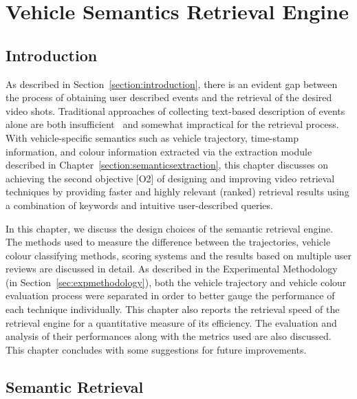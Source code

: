 
\chapter{Vehicle Semantics Retrieval Engine}

\label{section:retrievalengine}
\section{Introduction}

As described in Section~\ref{section:introduction}, there is an evident gap between the process of obtaining user described events and the retrieval of the desired video shots. Traditional approaches of collecting text-based description of events alone are both insufficient~\cite{bhaumik2016hybrid} and somewhat impractical for the retrieval process.
With vehicle-specific semantics such as vehicle trajectory, time-stamp information, and colour information extracted via the extraction module described in Chapter~\ref{section:semanticsextraction}, this chapter discusses on achieving the second objective [O2] of designing and improving video retrieval techniques by providing faster and highly relevant (ranked) retrieval results using a combination of keywords and intuitive user-described queries.

In this chapter, we discuss the design choices of the semantic retrieval engine. 
The methods used to measure the difference between the
trajectories, vehicle colour classifying methods, scoring systems and the results based on multiple user reviews are discussed in detail.
As described in the Experimental Methodology (in Section~\ref{sec:expmethodology}),
both the vehicle trajectory and vehicle colour evaluation process were separated in order to better gauge the performance of each technique individually.
This chapter also reports the retrieval speed of the retrieval engine for a quantitative measure of its efficiency.
The evaluation and analysis of their performances along with the metrics used are also discussed. This chapter concludes with some
suggestions for future improvements.


\section{Semantic Retrieval}
\label{sec:semanticattributeretrieval}

